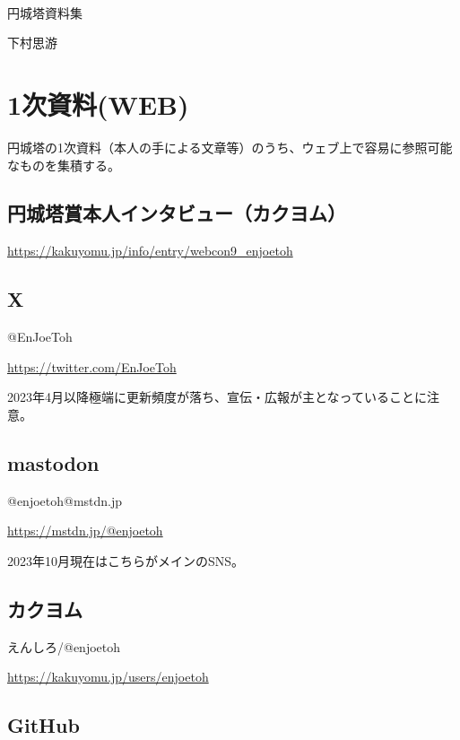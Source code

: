 \documentclass[10pt, a5paper, twoside]{jsarticle}
\theoremstyle{definition}
\begin{document}
	~ %

	\begin{center}

		\Large{円城塔資料集}

		\vspace{3mm}
		
		\large{下村思游}

	\end{center}

	\vspace{3mm}

	\section{1次資料(WEB)}

		円城塔の1次資料（本人の手による文章等）のうち、ウェブ上で容易に参照可能なものを集積する。

		\subsection{円城塔賞本人インタビュー（カクヨム）}

			\url{https://kakuyomu.jp/info/entry/webcon9_enjoetoh}

		\subsection{X}

			@EnJoeToh

			\url{https://twitter.com/EnJoeToh}

			2023年4月以降極端に更新頻度が落ち、宣伝・広報が主となっていることに注意。

		\subsection{mastodon}

			@enjoetoh@mstdn.jp
	
			\url{https://mstdn.jp/@enjoetoh}

			2023年10月現在はこちらがメインのSNS。

		\subsection{カクヨム}

			えんしろ/@enjoetoh

			\url{https://kakuyomu.jp/users/enjoetoh}

		\subsection{GitHub}
\end{document}
